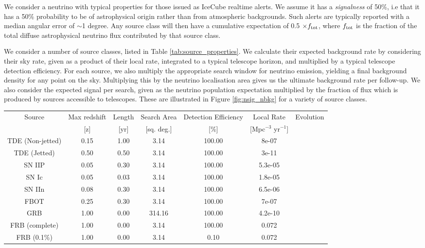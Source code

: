 We consider a neutrino with typical properties for those issued as IceCube realtime alerts. We assume it has a \emph{signalness} of 50\%, i.e that it has a 50\% probability to be of astrophysical origin rather than from atmospheric backgrounds. Such alerts are typically reported with a median angular error of $\sim$1 degree. Any source class will then have a cumulative expectation of 0.5 $\times f_{\textup{tot}}$, where $f_{\textup{tot}}$ is the fraction of the total diffuse astrophysical neutrino flux contributed by that source class. 
		
We consider a number of source classes, listed in Table \ref{tab:source_properties}. We calculate their expected background rate by considering their sky rate, given as a product of their local rate, integrated to a typical telescope horizon, and multiplied by a typical telescope detection efficiency. For each source, we also multiply the appropriate search window for neutrino emission, yielding a final background density for any point on the sky. Multiplying this by the neutrino localisation area gives us the ultimate background rate per follow-up. We also consider the expected signal per search, given as the neutrino population expectation multiplied by the fraction of flux which is produced by sources accessible to telescopes.  These are illustrated in Figure \ref{fig:nsig_nbkg} for a variety of source classes.

\begin{table*}[]
	\centering
	\begin{tabular}{||c c c c c c c|} 
	\hline
	Source & Max redshift & Length & Search Area & Detection Efficiency & Local Rate & Evolution \\
	& [z] & [yr] & [sq. deg.] & [\%] & [Mpc$^{-3}$ yr$^{-1}$] & \\
	\hline
	TDE (Non-jetted) & 0.15 & 1.00 & 3.14 & 100.00 & 8e-07 & \\
	TDE (Jetted) & 0.50 & 0.50 & 3.14 & 100.00 & 3e-11 & \\
	SN IIP & 0.05 & 0.30 & 3.14 & 100.00 & 5.3e-05 & \\
	SN Ic & 0.05 & 0.03 & 3.14 & 100.00 & 1.8e-05 & \\
	SN IIn & 0.08 & 0.30 & 3.14 & 100.00 & 6.5e-06 & \\
	FBOT & 0.25 & 0.30 & 3.14 & 100.00 & 7e-07 & \\
	GRB & 1.00 & 0.00 & 314.16 & 100.00 & 4.2e-10 & \\
	FRB (complete) & 1.00 & 0.00 & 3.14 & 100.00 & 0.072 & \\
	FRB (0.1\%) & 1.00 & 0.00 & 3.14 & 0.10 & 0.072 & \\
	\hline
	\end{tabular}
	\caption{Summary of assumptions on source classes.}
	\label{tab:source_properties}
\end{table*}{}


